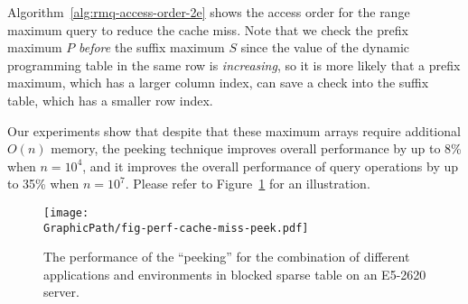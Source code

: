 Algorithm~\ref{alg:rmq-access-order-2e} shows the access order for the
range maximum query to reduce the cache miss.  Note that we check the
prefix maximum $P$ {\em before} the suffix maximum $S$ since the value
of the dynamic programming table in the same row is {\em increasing},
so it is more likely that a prefix maximum, which has a larger column
index, can save a check into the suffix table, which has a smaller row
index.

Our experiments show that despite that these maximum arrays require
additional $O(n)$ memory, the peeking technique improves overall
performance by up to 8\% when $n = 10^4$, and it improves the overall
performance of query operations by up to 35\% when $n = 10^7$.  Please
refer to Figure~\ref{fig:fig-perf-cache-miss-peek} for an illustration.

\begin{figure}[!thb]
  \centering
  \texttt{[image: \\GraphicPath/fig-perf-cache-miss-peek.pdf]}
  \caption{The performance of the ``peeking'' for
  the combination of different applications and environments in blocked
  sparse table on an E5-2620 server.}
  \label{fig:fig-perf-cache-miss-peek}
\end{figure}




